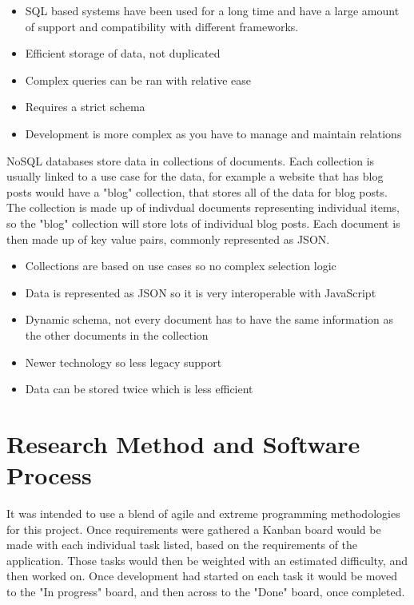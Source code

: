   \begin{itemize}
    \item SQL based systems have been used for a long time and have a large amount of support and compatibility with different frameworks. 
    \item Efficient storage of data, not duplicated
    \item Complex queries can be ran with relative ease
    \item Requires a strict schema 
    \item Development is more complex as you have to manage and maintain relations
  \end{itemize}

  NoSQL databases store data in collections of documents. Each collection is usually linked to a use case for the data, for example a website that has blog posts would have a "blog" collection, that stores all of the data for blog posts. The collection is made up of indivdual documents representing individual items, so the "blog" collection will store lots of individual blog posts. Each document is then made up of key value pairs, commonly represented as JSON. 

  \begin{itemize}
    \item Collections are based on use cases so no complex selection logic
    \item Data is represented as JSON so it is very interoperable with JavaScript
    \item Dynamic schema, not every document has to have the same information as the other documents in the collection
    \item Newer technology so less legacy support
    \item Data can be stored twice which is less efficient
  \end{itemize}



\section{Research Method and Software Process}
It was intended to use a blend of agile and extreme programming methodologies for this project. Once requirements were gathered a Kanban board would be made with each individual task listed, based on the requirements of the application. Those tasks would then be weighted with an estimated difficulty, and then worked on. Once development had started on each task it would be moved to the "In progress" board, and then across to the "Done" board, once completed. 

